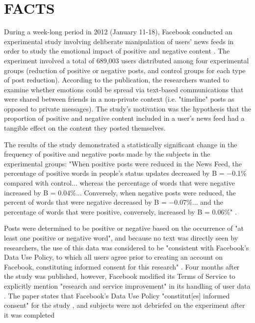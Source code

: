 
\section{FACTS}
During a week-long period in 2012 (January 11-18), Facebook conducted an experimental study involving deliberate manipulation of users' news feeds in order to study the emotional impact of positive and negative content \cite{study}.  The experiment involved a total of 689,003 users distributed among four experimental groups (reduction of positive or negative posts, and control groups for each type of post reduction).  According to the publication, the researchers wanted to examine whether emotions could be spread via text-based communications that were shared between friends in a non-private context (i.e. "timeline" posts as opposed to private messages).  The study's motivation was the hypothesis that the proportion of positive and negative content included in a user's news feed had a tangible effect on the content they posted themselves.\par

The results of the study demonstrated a statistically significant change in the frequency of positive and negative posts made by the subjects in the experimental groups: "When positive posts were reduced in the News Feed, the percentage of positive words in people’s status updates decreased by B = −0.1\% compared with control... whereas the percentage of words that were negative increased by B = 0.04\%... Conversely, when negative posts were reduced, the percent of words that were negative decreased by B = −0.07\%... and the percentage of words that were positive, conversely, increased by B = 0.06\%" \cite{study}.

Posts were determined to be positive or negative based on the occurrence of "at least one positive or negative word", and because no text was directly seen by researchers, the use of this data was considered to be "consistent with Facebook’s Data Use Policy, to which all users agree prior to creating an account on Facebook, constituting informed consent for this research" \cite{study}. Four months after the study was published, however, Facebook modified its Terms of Service to explicitly mention "research and service improvement" in its handling of user data \cite{forbes}.  The paper states that Facebook's Data Use Policy "constitut[es] informed consent" for the study \cite{study}, and subjects were not debriefed on the experiment after it was completed \cite{atlantic}\par
\vspace{0.4cm}
